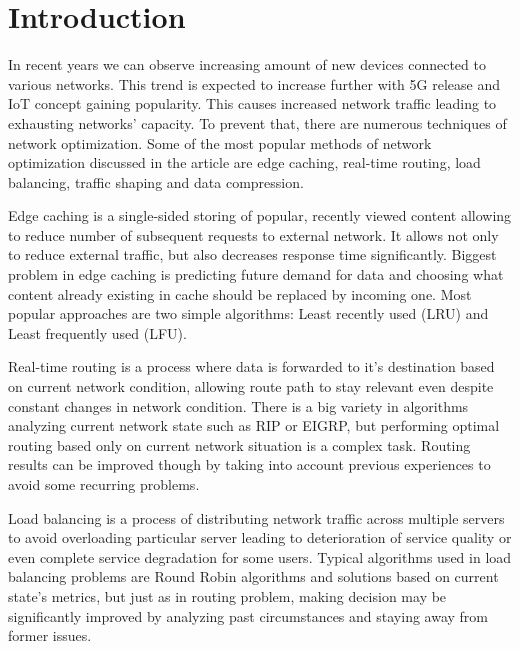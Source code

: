 \documentclass[conference]{IEEEtran}
\begin{document}
\section{Introduction}
In recent years we can observe increasing amount of new devices connected to various networks. This trend is expected to increase further with 5G release and IoT concept gaining popularity. This causes increased network traffic leading to exhausting networks' capacity. To prevent that, there are numerous techniques of network optimization. Some of the most popular methods of network optimization discussed in the article are edge caching, real-time routing, load balancing, traffic shaping and data compression.\par
Edge caching is a single-sided storing of popular, recently viewed content allowing to reduce number of subsequent requests to external network. It allows not only to reduce external traffic, but also decreases response time significantly. Biggest problem in edge caching is predicting future demand for data and choosing what content already existing in cache should be replaced by incoming one. Most popular approaches are two simple algorithms: Least recently used (LRU) and Least frequently used (LFU)\cite{cache1}\cite{cache2}.\par
Real-time routing is a process where data is forwarded to it's destination based on current network condition, allowing route path to stay relevant even despite constant changes in network condition. There is a big variety in algorithms analyzing current network state such as RIP or EIGRP, but performing optimal routing based only on current network situation is a complex task. Routing results can be improved though by taking into account previous experiences to avoid some recurring problems\cite{routing1}\cite{routing2}.\par
Load balancing is a process of distributing network traffic across multiple servers to avoid overloading particular server leading to deterioration of service quality or even complete service degradation for some users. Typical algorithms used in load balancing problems are Round Robin algorithms and solutions based on current state's metrics, but just as in routing problem, making decision may be significantly improved by analyzing past circumstances and staying away from former issues\cite{loadbalancing1}\cite{loadbalancing2}.\par
\end{document}

